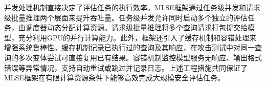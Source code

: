 并发处理机制直接决定了评估任务的执行效率。MLSE框架通过任务级并发和请求级批量推理两个层面来提升吞吐量。任务级并发允许同时启动多个独立的评估任务，由调度器动态分配计算资源。请求级批量推理将多个查询请求打包提交给模型，充分利用GPU的并行计算能力\cite{flashdecoding2024}。此外，框架还引入了缓存机制和容错处理来增强系统鲁棒性。缓存机制记录已执行过的查询及其响应，在攻击测试中对同一查询的多次变体尝试可直接复用已有结果。容错机制监控模型服务无响应、输出格式错误等异常情况，支持自动重试或跳过并记录日志。上述工程措施共同保证了MLSE框架在有限计算资源条件下能够高效完成大规模安全评估任务。
